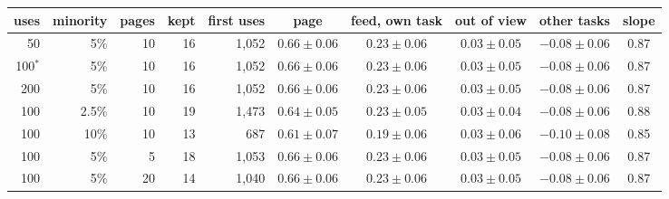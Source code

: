 \begin{tabular}{rrrrrccccc}
\toprule
uses & minority & pages & kept & first uses & page & feed, own task & out of view & other tasks & slope \\
\midrule
50 & 5\% & 10 & 16 & 1,052 & $0.66 \pm 0.06$ & $0.23 \pm 0.06$ & $0.03 \pm 0.05$ & $-0.08 \pm 0.06$ & 0.87 \\
100$^*$ & 5\% & 10 & 16 & 1,052 & $0.66 \pm 0.06$ & $0.23 \pm 0.06$ & $0.03 \pm 0.05$ & $-0.08 \pm 0.06$ & 0.87 \\
200 & 5\% & 10 & 16 & 1,052 & $0.66 \pm 0.06$ & $0.23 \pm 0.06$ & $0.03 \pm 0.05$ & $-0.08 \pm 0.06$ & 0.87 \\
100 & 2.5\% & 10 & 19 & 1,473 & $0.64 \pm 0.05$ & $0.23 \pm 0.05$ & $0.03 \pm 0.04$ & $-0.08 \pm 0.06$ & 0.88 \\
100 & 10\% & 10 & 13 & 687 & $0.61 \pm 0.07$ & $0.19 \pm 0.06$ & $0.03 \pm 0.06$ & $-0.10 \pm 0.08$ & 0.85 \\
100 & 5\% & 5 & 18 & 1,053 & $0.66 \pm 0.06$ & $0.23 \pm 0.06$ & $0.03 \pm 0.05$ & $-0.08 \pm 0.06$ & 0.87 \\
100 & 5\% & 20 & 14 & 1,040 & $0.66 \pm 0.06$ & $0.23 \pm 0.06$ & $0.03 \pm 0.05$ & $-0.08 \pm 0.06$ & 0.87 \\
\bottomrule
\end{tabular}
